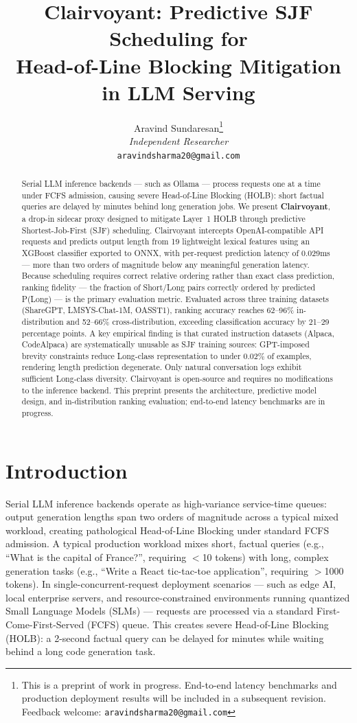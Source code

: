 \documentclass[10pt,letterpaper]{article}
\title{\textbf{Clairvoyant: Predictive SJF Scheduling for\\Head-of-Line Blocking Mitigation in LLM Serving}}
\author{Aravind Sundaresan\thanks{This is a preprint of work in progress. End-to-end latency benchmarks and production deployment results will be included in a subsequent revision. Feedback welcome: \texttt{aravindsharma20@gmail.com}} \\ \textit{Independent Researcher} \\ \texttt{aravindsharma20@gmail.com}}
\date{}
\begin{document}
\maketitle

\begin{abstract}
Serial LLM inference backends --- such as Ollama --- process requests one at a time under FCFS admission, causing severe Head-of-Line Blocking (HOLB): short factual queries are delayed by minutes behind long generation jobs. We present \textbf{Clairvoyant}, a drop-in sidecar proxy designed to mitigate Layer~1 HOLB through predictive Shortest-Job-First (SJF) scheduling. Clairvoyant intercepts OpenAI-compatible API requests and predicts output length from 19 lightweight lexical features using an XGBoost classifier exported to ONNX, with per-request prediction latency of 0.029ms --- more than two orders of magnitude below any meaningful generation latency. Because scheduling requires correct relative ordering rather than exact class prediction, ranking fidelity --- the fraction of Short/Long pairs correctly ordered by predicted P(Long) --- is the primary evaluation metric. Evaluated across three training datasets (ShareGPT, LMSYS-Chat-1M, OASST1), ranking accuracy reaches 62--96\% in-distribution and 52--66\% cross-distribution, exceeding classification accuracy by 21--29 percentage points. A key empirical finding is that curated instruction datasets (Alpaca, CodeAlpaca) are systematically unusable as SJF training sources: GPT-imposed brevity constraints reduce Long-class representation to under 0.02\% of examples, rendering length prediction degenerate. Only natural conversation logs exhibit sufficient Long-class diversity. Clairvoyant is open-source and requires no modifications to the inference backend. This preprint presents the architecture, predictive model design, and in-distribution ranking evaluation; end-to-end latency benchmarks are in progress.
\end{abstract}

\section{Introduction}
\label{sec:introduction}

Serial LLM inference backends operate as high-variance service-time queues: output generation lengths span two orders of magnitude across a typical mixed workload, creating pathological Head-of-Line Blocking under standard FCFS admission. A typical production workload mixes short, factual queries (e.g., ``What is the capital of France?'', requiring $<$10 tokens) with long, complex generation tasks (e.g., ``Write a React tic-tac-toe application'', requiring $>$1000 tokens). In single-concurrent-request deployment scenarios --- such as edge AI, local enterprise servers, and resource-constrained environments running quantized Small Language Models (SLMs) --- requests are processed via a standard First-Come-First-Served (FCFS) queue. This creates severe Head-of-Line Blocking (HOLB): a 2-second factual query can be delayed for minutes while waiting behind a long code generation task.
\end{document}
